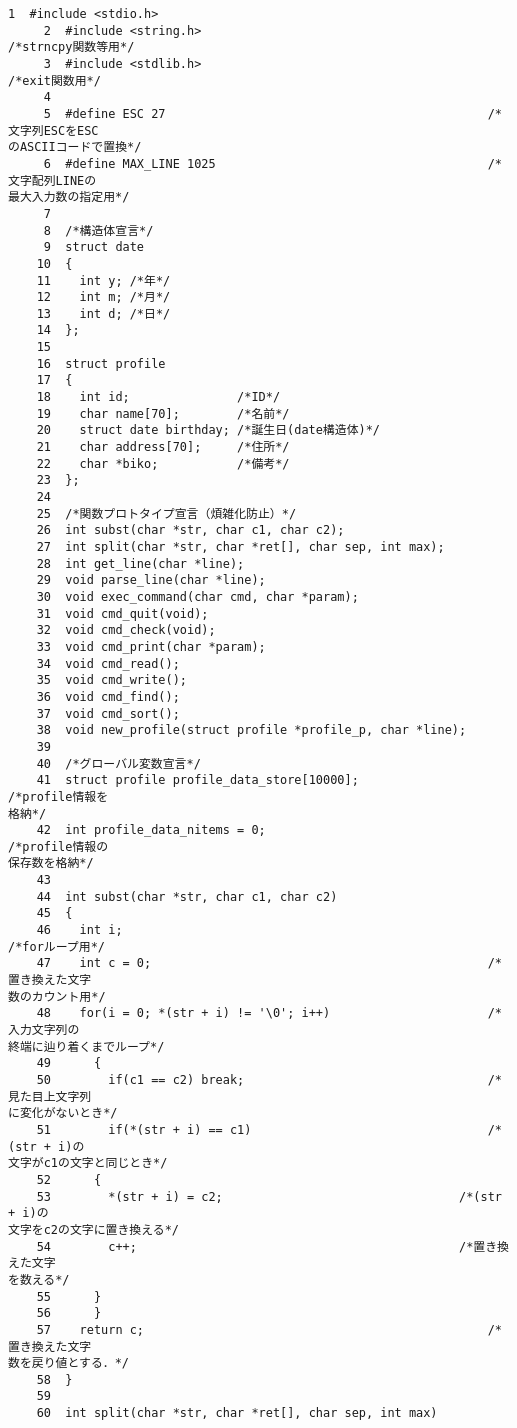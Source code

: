 \begin{Verbatim}[fontsize=\small, baselinestretch=0.8]
     1	#include <stdio.h>
     2	#include <string.h>                                        /*strncpy関数等用*/
     3	#include <stdlib.h>                                        /*exit関数用*/
     4	
     5	#define ESC 27                                             /*文字列ESCをESC
のASCIIコードで置換*/
     6	#define MAX_LINE 1025                                      /*文字配列LINEの
最大入力数の指定用*/
     7	
     8	/*構造体宣言*/
     9	struct date
    10	{
    11	  int y; /*年*/
    12	  int m; /*月*/
    13	  int d; /*日*/
    14	};
    15	
    16	struct profile
    17	{
    18	  int id;               /*ID*/
    19	  char name[70];        /*名前*/
    20	  struct date birthday; /*誕生日(date構造体)*/
    21	  char address[70];     /*住所*/
    22	  char *biko;           /*備考*/
    23	};
    24	
    25	/*関数プロトタイプ宣言（煩雑化防止）*/
    26	int subst(char *str, char c1, char c2);
    27	int split(char *str, char *ret[], char sep, int max);
    28	int get_line(char *line);
    29	void parse_line(char *line);
    30	void exec_command(char cmd, char *param);
    31	void cmd_quit(void);
    32	void cmd_check(void);
    33	void cmd_print(char *param);
    34	void cmd_read();
    35	void cmd_write();
    36	void cmd_find();
    37	void cmd_sort();
    38	void new_profile(struct profile *profile_p, char *line);
    39	
    40	/*グローバル変数宣言*/
    41	struct profile profile_data_store[10000];                  /*profile情報を
格納*/
    42	int profile_data_nitems = 0;                               /*profile情報の
保存数を格納*/
    43	
    44	int subst(char *str, char c1, char c2)
    45	{
    46	  int i;                                                   /*forループ用*/
    47	  int c = 0;                                               /*置き換えた文字
数のカウント用*/
    48	  for(i = 0; *(str + i) != '\0'; i++)                      /*入力文字列の
終端に辿り着くまでループ*/
    49	    {
    50	      if(c1 == c2) break;                                  /*見た目上文字列
に変化がないとき*/
    51	      if(*(str + i) == c1)                                 /*(str + i)の
文字がc1の文字と同じとき*/
    52		{
    53		  *(str + i) = c2;                                 /*(str + i)の
文字をc2の文字に置き換える*/
    54		  c++;                                             /*置き換えた文字
を数える*/
    55		}
    56	    }
    57	  return c;                                                /*置き換えた文字
数を戻り値とする．*/
    58	}
    59	
    60	int split(char *str, char *ret[], char sep, int max)

\end{Verbatim}
